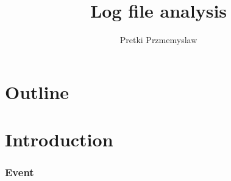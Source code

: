 \documentclass{beamer}
\title{Log file analysis}
\author{Pretki Przmemyslaw}
\begin{document}
\section*{Outline}
\begin{frame}
  \tableofcontents
\end{frame}


\section{Introduction}
\begin{frame}
  \frametitle{Event}
  
\end{frame}
\end{document}
